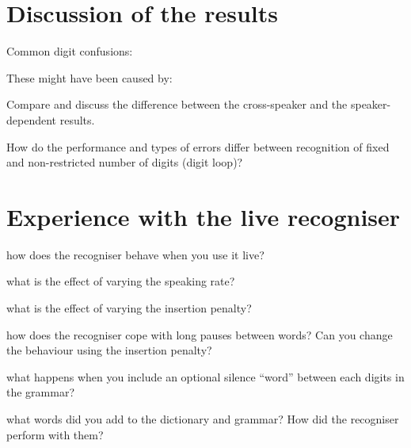 \documentclass[onecolumn]{article}
\begin{document}
\clearpage
\section*{Discussion of the results}
Common digit confusions:
\vspace{0.2\textheight}

\noindent These might have been caused by:
\vspace{0.4\textheight}

\noindent Compare and discuss the difference between the cross-speaker and the speaker-dependent results. 
\vspace{0.4\textheight}

\noindent How do the performance and types of errors differ between recognition of fixed and non-restricted number of digits (digit loop)?
\vspace{0.3\textheight}

\section*{Experience with the live recogniser}
\noindent how does the recogniser behave when you use it live?
\vspace{0.3\textheight}

\noindent what is the effect of varying the speaking rate?
\clearpage

\noindent what is the effect of varying the insertion penalty?
\vspace{0.3\textheight}

\noindent how does the recogniser cope with long pauses between words? Can you change the behaviour using the insertion penalty?
\vspace{0.3\textheight}

\noindent what happens when you include an optional silence ``word'' between each digits in the grammar?
\clearpage

\noindent what words did you add to the dictionary and grammar? How did the recogniser perform with them?
\end{document}
